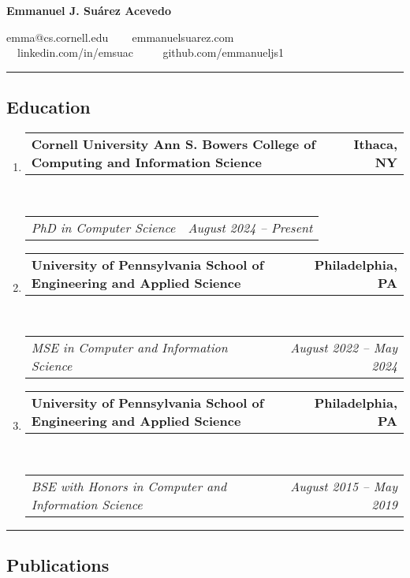 \documentclass[letterpaper]{article}
\makeatletter
\newif\iflong
\newcommand{\headerrow}[2]
{\begin{tabular*}{\linewidth}{l@{\extracolsep{\fill}}r}
	#1 &
	#2 \\
\end{tabular*}}
\makeatother
\begin{document}
\begin{center}
{\LARGE \textbf{Emmanuel J. Suárez Acevedo}}

emma@cs.cornell.edu \ \textbullet
\ \ emmanuelsuarez.com \\

\ \ linkedin.com/in/emsuac \ \ \textbullet
\ \ github.com/emmanueljs1\\
\end{center}
\hrule

\iflong
\subsection*{Research Interests}
\begin{enumerate}[label=]
       \parskip=-0.25em

    \item Programming language theory, type theory, proof assistants
\end{enumerate}
\hrule
\fi

\subsection*{Education}
  
\begin{enumerate}[label=]
	\parskip=-0.05em
	\item
	\headerrow
        {\textbf{Cornell University Ann S. Bowers College of Computing and Information Science}}
		{\textbf{Ithaca, NY}}
	\\
	\headerrow
		{\emph{PhD in Computer Science}}
        {\emph{August 2024 -- Present}}

	\item 
	\headerrow
		{\textbf{University of Pennsylvania School of Engineering and Applied Science}}
		{\textbf{Philadelphia, PA}}
	\\
	\headerrow
		{\emph{MSE in Computer and Information Science}}
		{\emph{August 2022 -- May 2024}}

	\item 
	\headerrow
		{\textbf{University of Pennsylvania School of Engineering and Applied Science}}
		{\textbf{Philadelphia, PA}}
	\\
	\headerrow
		{\emph{BSE with Honors in Computer and Information Science}}
		{\emph{August 2015 -- May 2019}}

\end{enumerate}

\hrule
\subsection*{Publications}
  
\end{document}
